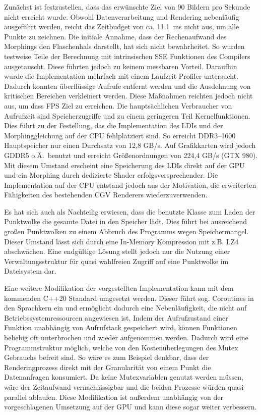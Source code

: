 \documentclass[hyperref, beleg, german, final, twoside]{cgvpub}
\begin{document}
Zunächst ist festzustellen, dass das erwünschte Ziel von 90 Bildern pro Sekunde
nicht erreicht wurde. Obwohl Datenverarbeitung und Rendering nebenläufig
ausgeführt werden, reicht das Zeitbudget von ca. \SI{11,1}{\milli\second} nicht
aus, um alle Punkte zu zeichnen. Die initiale Annahme, dass der Rechenaufwand
des Morphings den Flaschenhals darstellt, hat sich nicht bewahrheitet. So
wurden testweise Teile der Berechnung mit intrinsischen SSE Funktionen des
Compilers ausgetauscht. Diese führten jedoch zu keinem messbaren Vorteil.
Daraufhin wurde die Implementation mehrfach mit einem Laufzeit-Profiler
untersucht. Dadurch konnten überflüssige Aufrufe entfernt werden und die
Ausdehnung von kritischen Bereichen verkleinert werden. Diese Maßnahmen
reichten jedoch nicht aus, um dass FPS Ziel zu erreichen. Die hauptsächlichen
Verbraucher von Aufrufzeit sind Speicherzugriffe und zu einem geringeren Teil
Kernelfunktionen. Dies führt zu der Festellung, das die Implementation des LDIs
und der Morphinggleichung auf der CPU fehlplatziert sind. So erreicht
DDR3--1600 Hauptspeicher nur einen Durchsatz von 12,8 GB/s. Auf Grafikkarten
wird jedoch GDDR5 o.Ä.\ benutzt und erreicht Größenordnungen von 224,4 GB/s
(GTX 980). Mit diesem Umstand erscheint eine Speicherung des LDIs direkt auf
der GPU und ein Morphing durch dedizierte Shader erfolgsversprechender. Die
Implementation auf der CPU entstand jedoch aus der Motivation, die erweiterten
Fähigkeiten des bestehenden CGV Renderers wiederzuverwenden.

Es hat sich auch als Nachteilig erwiesen, dass die benutzte Klasse zum Laden
der Punktwolke die gesamte Datei in den Speicher lädt. Dies führt bei
ausreichend großen Punktwolken zu einem Abbruch des Programms wegen
Speichermangel. Dieser Umstand lässt sich durch eine In-Memory Kompression mit
z.B. LZ4 abschwächen. Eine endgültige Lösung stellt jedoch nur die Nutzung
einer Verwaltungsstruktur für quasi wahlfreien Zugriff auf eine Punktwolke im
Dateisystem dar.

Eine weitere Modifikation der vorgestellten Implementation kann mit dem
kommenden C++20 Standard umgesetzt werden. Dieser führt sog. Coroutines in den
Sprachkern ein und ermöglicht dadurch eine Nebenläufigkeit, die nicht auf
Betriebssystemressourcen angewiesen ist. Indem der Aufrufzustand einer Funktion
unabhängig von Aufrufstack gespeichert wird, können Funktionen beliebig oft
unterbrochen und wieder aufgenommen werden. Dadurch wird eine Programmstruktur
möglich, welche von den Kostenüberlegungen des Mutex Gebrauchs befreit sind. So
wäre es zum Beispiel denkbar, dass der Renderingprozess direkt mit der
Granularität von einem Punkt die Datenanfragen konsumiert. Da keine
Mutexvariablen genutzt werden müssen, wäre der Zeitaufwand vernachlässigbar und
die beiden Prozesse würden quasi parallel ablaufen. Diese Modifikation ist
außerdem unabhängig von der vorgeschlagenen Umsetzung auf der GPU und kann
diese sogar weiter verbessern.
\end{document}
